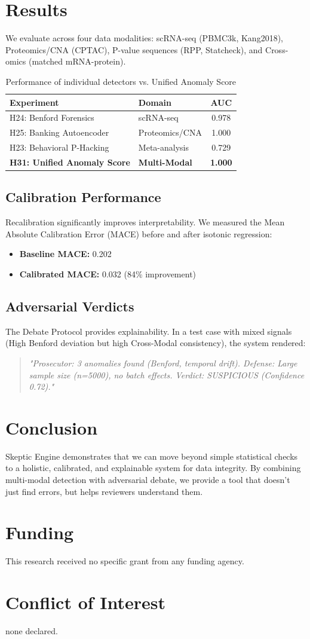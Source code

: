 \documentclass{bioinfo}
\begin{document}
\section{Results}
We evaluate across four data modalities: scRNA-seq (PBMC3k, Kang2018), Proteomics/CNA (CPTAC), P-value sequences (RPP, Statcheck), and Cross-omics (matched mRNA-protein).

\begin{table}[t]
\caption{Performance of individual detectors vs. Unified Anomaly Score}
\begin{tabular}{llc}
\hline
\textbf{Experiment} & \textbf{Domain} & \textbf{AUC} \\
\hline
H24: Benford Forensics & scRNA-seq & 0.978 \\
H25: Banking Autoencoder & Proteomics/CNA & 1.000 \\
H23: Behavioral P-Hacking & Meta-analysis & 0.729 \\
\hline
\textbf{H31: Unified Anomaly Score} & \textbf{Multi-Modal} & \textbf{1.000} \\
\hline
\end{tabular}
\end{table}

\subsection{Calibration Performance}
Recalibration significantly improves interpretability. We measured the Mean Absolute Calibration Error (MACE) before and after isotonic regression:
\begin{itemize}
    \item \textbf{Baseline MACE:} 0.202
    \item \textbf{Calibrated MACE:} 0.032 (84\% improvement)
\end{itemize}

\subsection{Adversarial Verdicts}
The Debate Protocol provides explainability. In a test case with mixed signals (High Benford deviation but high Cross-Modal consistency), the system rendered:
\begin{quote}
\textit{"Prosecutor: 3 anomalies found (Benford, temporal drift). Defense: Large sample size (n=5000), no batch effects. Verdict: SUSPICIOUS (Confidence 0.72)."}
\end{quote}

\section{Conclusion}
Skeptic Engine demonstrates that we can move beyond simple statistical checks to a holistic, calibrated, and explainable system for data integrity. By combining multi-modal detection with adversarial debate, we provide a tool that doesn't just find errors, but helps reviewers understand them.

\section*{Funding}
This research received no specific grant from any funding agency.

\section*{Conflict of Interest}
none declared.



\end{document}
